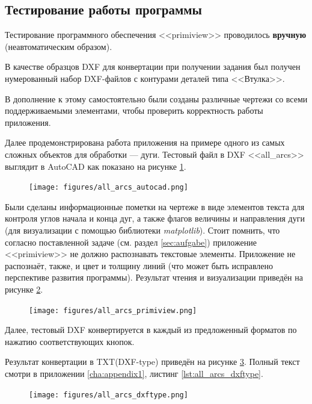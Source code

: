 \subsection{Тестирование работы программы}

Тестирование программного обеспечения <<primiview>> проводилось \textbf{вручную} (неавтоматическим образом).

В качестве образцов DXF для конвертации при получении задания был получен нумерованный набор DXF-файлов с контурами деталей типа <<Втулка>>.

В дополнение к этому самостоятельно были созданы различные чертежи со всеми поддерживаемыми элементами, чтобы проверить корректность работы приложения.

Далее продемонстрирована работа приложения на примере одного из самых сложных объектов для обработки --- дуги. Тестовый файл в DXF <<all\_arcs>> выглядит в AutoCAD как показано на рисунке \ref{fig:all_arcs_autocad}.

\begin{figure}[H]
	\centering
	\texttt{[image: figures/all\_arcs\_autocad.png]}
	\label{fig:all_arcs_autocad}
\end{figure}

Были сделаны информационные пометки на чертеже в виде элементов текста для контроля углов начала и конца дуг, а также флагов величины и направления дуги (для визуализации с помощью библиотеки \textit{matplotlib}). Стоит помнить, что согласно поставленной задаче (см. раздел \ref{sec:aufgabe}) приложение <<primiview>> не должно распознавать текстовые элементы. Приложение не распознаёт, также, и цвет и толщину линий (что может быть исправлено перспективе развития программы). Результат чтения и визуализации приведён на рисунке \ref{fig:all_arcs_primiview}.

\begin{figure}[H]
	\centering
	\texttt{[image: figures/all\_arcs\_primiview.png]}
	\label{fig:all_arcs_primiview}
\end{figure}

Далее, тестовый DXF конвертируется в каждый из предложенный форматов по нажатию соответствующих кнопок.

Результат конвертации в TXT(DXF-type) приведён на рисунке \ref{fig:all_arcs_dxftype}. Полный текст смотри в приложении \ref{cha:appendix1}, листинг \ref{lst:all_arcs_dxftype}.

\begin{figure}[H]
	\centering
	\texttt{[image: figures/all\_arcs\_dxftype.png]}
	\label{fig:all_arcs_dxftype}
\end{figure}

